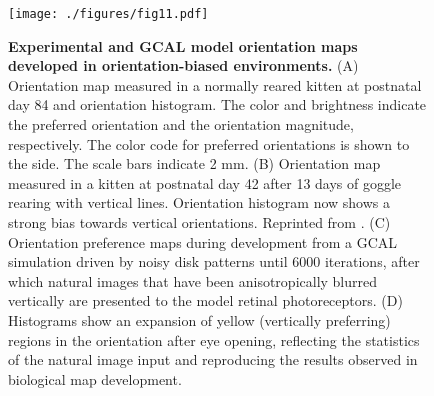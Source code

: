 \documentclass{article}
\def \scalefactor {0.666666}
\def \GRScale {\scalefactor}               %
\begin{document}
\begin{figure}
\centerline{
\texttt{[image: ./figures/fig11.pdf]}
}
\caption[Experimental and model orientation maps developed in
  orientation restricted environments] {\textbf{Experimental and GCAL
    model orientation maps developed in orientation-biased
    environments.}  (A) Orientation map measured in a normally reared
  kitten at postnatal day 84 and orientation
  histogram.  The color and brightness indicate the
    preferred orientation and the orientation magnitude,
    respectively. The color code for preferred orientations is shown
    to the side. The scale bars indicate 2 mm. (B) Orientation map
  measured in a kitten at postnatal day 42 after
  13 days of goggle rearing with
  vertical lines. Orientation histogram now shows
  a strong bias towards vertical orientations. Reprinted from
  \citet{Tanaka2009}. (C) Orientation preference
  maps during development from a GCAL simulation driven by noisy disk
  patterns until 6000 iterations, after which natural images
  that have been anisotropically blurred
    vertically are presented to the model retinal photoreceptors.
  (D) Histograms show an expansion of yellow
  (vertically preferring) regions in the orientation after eye
  opening, reflecting the statistics of the natural image input and
  reproducing the results observed in biological map development.}
    \label{fig:naturalsets}

\end{figure}
\end{document}

